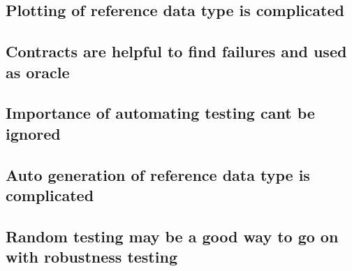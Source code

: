 \subsection{Plotting of reference data type is complicated}




\subsection{Contracts are helpful to find failures and used as oracle}

\subsection{Importance of automating testing cant be ignored}

\subsection{Auto generation of reference data type is complicated}

\subsection{Random testing may be a good way to go on with robustness testing}





